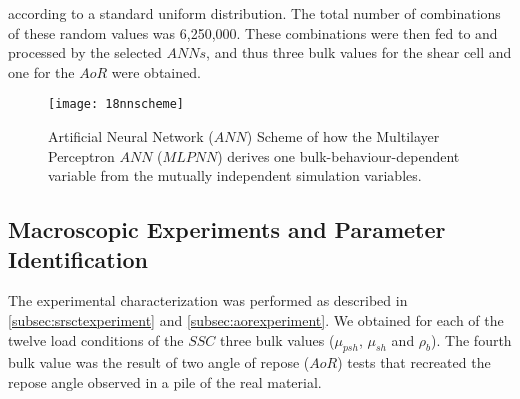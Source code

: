 \documentclass{llncs}
\begin{document}
according to a standard uniform distribution.
The total number of combinations of these random values was 6,250,000.
These combinations were then fed to and processed by the selected
$ANNs$, and thus three bulk values for the shear
cell and one for the $AoR$ were obtained.
\begin{figure}[!htb] 
\centering 
\texttt{[image: 18nnscheme]} 
\caption[ANN Scheme]{Artificial Neural Network ($ANN$) Scheme
of how the Multilayer Perceptron $ANN$ ($MLPNN$) derives one
bulk-behaviour-dependent variable from the mutually independent simulation variables.}
\label{fig:18nnscheme} 
\end{figure}

\subsection{Macroscopic Experiments and Parameter Identification}
\label{subsec:macroscopicexperimentsparameteridentification}
The experimental characterization was performed as described in
\ref{subsec:srsctexperiment} and \ref{subsec:aorexperiment}. 
We obtained for each of the twelve load conditions of the $SSC$ three bulk
values ($\mu_{psh}$, $\mu_{sh}$ and $\rho_b$).
The fourth bulk value was the result of two angle of repose ($AoR$) tests that
recreated the repose angle observed in a pile of the
real material. 
\end{document}
